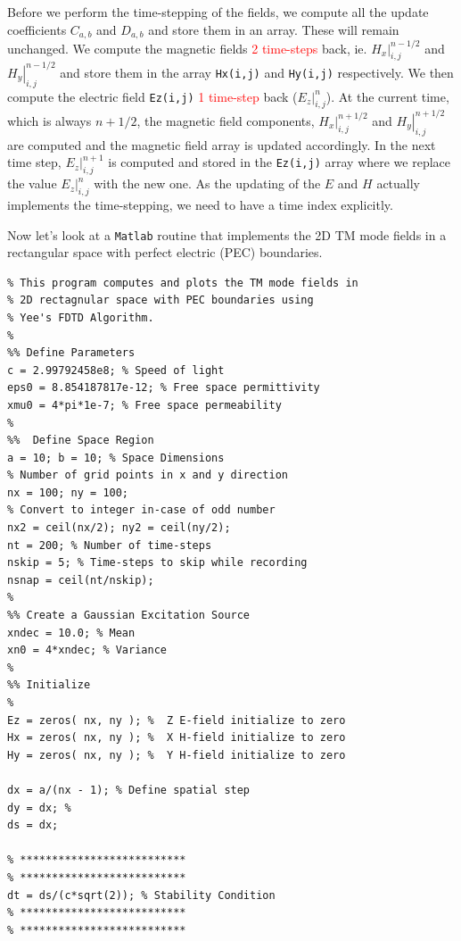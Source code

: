 \documentclass[11pt]{article}
\begin{document}
\begin{outline}[enumerate]
  \1 Before we perform the time-stepping of the fields, we compute all the update coefficients $C_{a,b}$ and $D_{a,b}$ and store them in an array. These will remain unchanged.
  \1 We compute the magnetic fields \textcolor{red}{2 time-steps} back, ie. $\left. H_x \right|^{n - 1/2}_{i,j}$ and $\left. H_y \right|^{n - 1/2}_{i,j}$ and store them in the array \texttt{Hx(i,j)} and \texttt{Hy(i,j)} respectively.
  \1 We then compute the electric field \texttt{Ez(i,j)} \textcolor{red}{1 time-step} back ($\left. E_z \right|^{n}_{i,j}$).
  \1 At the current time, which is always $n + 1/2$, the magnetic field components, $\left. H_x \right|^{n + 1/2}_{i,j}$ and $\left. H_y \right|^{n + 1/2}_{i,j}$ are computed and the magnetic field array is updated accordingly.
  \1 In the next time step, $\left. E_z \right|^{n+1}_{i,j}$ is computed and stored in the \texttt{Ez(i,j)} array where we replace the value $\left. E_z \right|^{n}_{i,j}$ with the new one.
  \1 As the updating of the $E$ and $H$ actually implements the time-stepping, we need to have a time index explicitly.
\end{outline}

Now let's look at a \texttt{Matlab} routine that implements the 2D TM mode fields in a rectangular space with perfect electric (PEC) boundaries.

\begin{mdframed}[backgroundcolor=gray!20]
  \scriptsize
  \begin{verbatim}
% This program computes and plots the TM mode fields in 
% 2D rectagnular space with PEC boundaries using 
% Yee's FDTD Algorithm. 
%
%% Define Parameters
c = 2.99792458e8; % Speed of light
eps0 = 8.854187817e-12; % Free space permittivity
xmu0 = 4*pi*1e-7; % Free space permeability
%
%%  Define Space Region
a = 10; b = 10; % Space Dimensions
% Number of grid points in x and y direction
nx = 100; ny = 100; 
% Convert to integer in-case of odd number
nx2 = ceil(nx/2); ny2 = ceil(ny/2); 
nt = 200; % Number of time-steps
nskip = 5; % Time-steps to skip while recording
nsnap = ceil(nt/nskip);
%
%% Create a Gaussian Excitation Source
xndec = 10.0; % Mean
xn0 = 4*xndec; % Variance
%
%% Initialize
%
Ez = zeros( nx, ny ); %  Z E-field initialize to zero
Hx = zeros( nx, ny ); %  X H-field initialize to zero
Hy = zeros( nx, ny ); %  Y H-field initialize to zero

dx = a/(nx - 1); % Define spatial step
dy = dx; %
ds = dx;

% **************************
% **************************
dt = ds/(c*sqrt(2)); % Stability Condition
% **************************
% **************************

\end{verbatim}
\end{mdframed}
\end{document}
